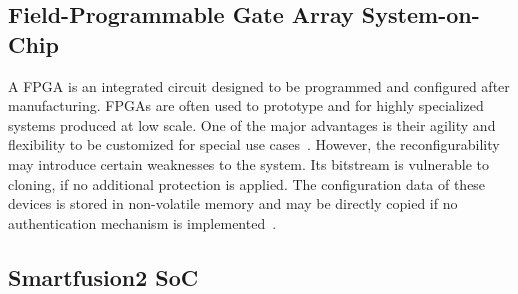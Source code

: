 \subsection{Field-Programmable Gate Array System-on-Chip}\label{chap:background:computing:smartfusion}
A \ac{FPGA} is an integrated circuit designed to be programmed and configured after manufacturing. \ac{FPGA}s are often used to prototype and for highly specialized systems produced at low scale. One of the major advantages is their agility and flexibility to be customized for special use cases~\cite{cyberphysicalsystems}. However, the reconfigurability may introduce certain weaknesses to the system. Its bitstream is vulnerable to cloning, if no additional protection is applied. The configuration data of these devices is stored in non-volatile memory and may be directly copied if no authentication mechanism is implemented~\cite{drimer2007authentication}.

\subsection*{Smartfusion2 SoC}\label{chap:background:computing:smartfusion}

